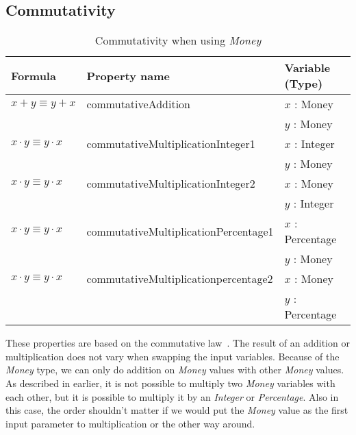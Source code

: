 \subsection*{Commutativity}
\label{ssct:properties_commutativity}
\begin{table}[!ht]
\centering
\begin{tabular}{lll}
\hline
                        \textbf{Formula} & \textbf{Property name}               & \textbf{Variable (Type)} \\ \hline
\rowcolor[HTML]{EFEFEF} $x + y \equiv y + x$   & commutativeAddition                  & $x$ : Money                 \\
\rowcolor[HTML]{EFEFEF}                  &                                      & $y$ : Money                 \\
                        $x \cdot y \equiv y \cdot x$   & commutativeMultiplicationInteger1    & $x$ : Integer               \\
                                         &                                      & $y$ : Money                 \\
\rowcolor[HTML]{EFEFEF} $x \cdot y \equiv y \cdot x$   & commutativeMultiplicationInteger2    & $x$ : Money                 \\
\rowcolor[HTML]{EFEFEF}                  &                                      & $y$ : Integer               \\
                        $x \cdot y \equiv y \cdot x$   & commutativeMultiplicationPercentage1 & $x$ : Percentage            \\
                                         &                                      & $y$ : Money                 \\
\rowcolor[HTML]{EFEFEF} $x \cdot y \equiv y \cdot x$   & commutativeMultiplicationpercentage2 & $x$ : Money                 \\
\rowcolor[HTML]{EFEFEF}                  &                                      & $y$ : Percentage            \\ \hline
\end{tabular}
\caption{Commutativity when using \textit{Money}}
\label{tbl:ch4_money_commutativity}
\end{table}
\FloatBarrier\noindent
These properties are based on the commutative law~\cite{baumgart1961axioms}.
The result of an addition or multiplication does not vary when swapping the
input variables. Because of the \textit{Money} type, we can only do addition on
\textit{Money} values with other \textit{Money} values. As described in earlier, it is not possible to
multiply two \textit{Money} variables with each other, but it is possible to multiply it by
an \textit{Integer} or \textit{Percentage}. Also in this case, the order
shouldn't matter if we would put the \textit{Money} value as the first input
parameter to multiplication or the other way around.


